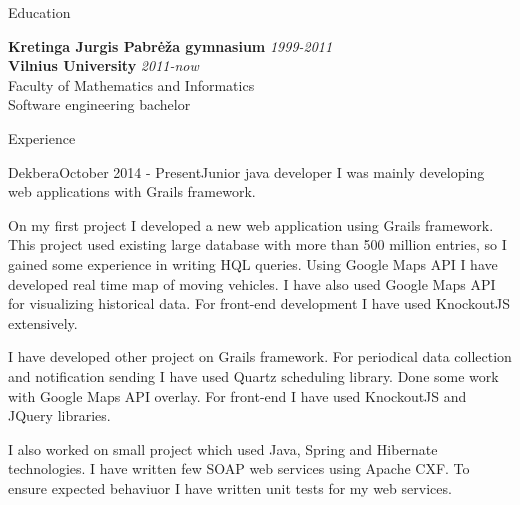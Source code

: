 \documentclass[]{resume} %
\begin{document}

\begin{rSection}{Education}

{\bf Kretinga Jurgis Pabrėža gymnasium} \hfill {\em 1999-2011} \\
{\bf Vilnius University} \hfill {\em 2011-now} \\
Faculty of Mathematics and Informatics\\
Software engineering bachelor\\

\end{rSection}

\begin{rSection}{Experience}

    \begin{rSubsection}{Dekbera}{October 2014 - Present}{Junior java developer}{}
        I was mainly developing web applications with Grails framework.

        On my first project I developed a new web application using Grails framework.
        This project used existing large database with more than 500 million entries, so I gained some experience in writing HQL queries.
        Using Google Maps API I have developed real time map of moving vehicles.
        I have also used Google Maps API for visualizing historical data.
        For front-end development I have used KnockoutJS extensively.

        I have developed other project on Grails framework.
        For periodical data collection and notification sending I have used Quartz scheduling library.
        Done some work with Google Maps API overlay.
        For front-end I have used KnockoutJS and JQuery libraries.

        I also worked on small project which used Java, Spring and Hibernate technologies.
        I have written few SOAP web services using Apache CXF.
        To ensure expected behaviuor I have written unit tests for my web services.

    \end{rSubsection}

\end{rSection}
\end{document}
